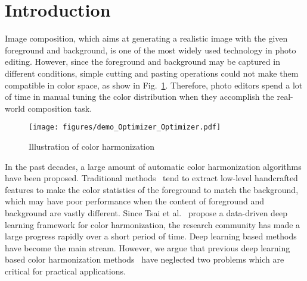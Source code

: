 \documentclass[runningheads]{llncs}
\begin{document}
\section{Introduction}
    

Image composition, which aims at generating a realistic image with the given foreground and background, is one of the most widely used technology in photo editing.
    However, since the foreground and background may be captured in different conditions, simple cutting and pasting operations could not make them compatible in color space, as show in Fig.~\ref{fig:color_harmonization_demo}.
    Therefore, photo editors spend a lot of time in manual tuning the color distribution when they accomplish the real-world composition task.
    
\begin{figure}
        \centering
        \texttt{[image: figures/demo\_Optimizer\_Optimizer.pdf]}\\
        \caption{
            \small Illustration of color harmonization}
        \label{fig:color_harmonization_demo}
        \vspace{-0.8cm}
    \end{figure}
    
    
    
In the past decades, a large amount of automatic color harmonization algorithms have been proposed.
    Traditional methods~\cite{cohen2006color, pitie2005n, pitie2007linear, reinhard2001color, perez2003poisson, jia2006drag, tao2010error, sunkavalli2010multi} tend to extract low-level handcrafted features to make the color statistics of the foreground to match the background, which may have poor performance when the content of foreground and background are vastly different.
    Since Tsai et al.~\cite{tsai2017deep} propose a data-driven deep learning framework for color harmonization, the research community has made a large progress rapidly over a short period of time.
    Deep learning based methods have become the main stream.
    However, we argue that previous deep learning based color harmonization methods~\cite{tsai2017deep, cun2020improving, sofiiuk2021foreground, Ling_2021_CVPR, cong2020dovenet, cong2021bargainnet, guo2021intrinsic} have neglected two problems which are critical for practical applications.
    
\end{document}

